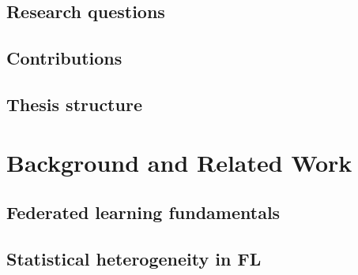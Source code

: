 \documentclass[11pt,a4paper]{report}
\begin{document}
\section{Research questions}
\label{sec:intro-questions}

\section{Contributions}
\label{sec:intro-contributions}

\section{Thesis structure}
\label{sec:intro-structure}


\chapter{Background and Related Work}
\label{ch:background}


\section{Federated learning fundamentals}
\label{sec:bg-fl-fundamentals}

\section{Statistical heterogeneity in FL}
\label{sec:bg-stat-het}
\end{document}
